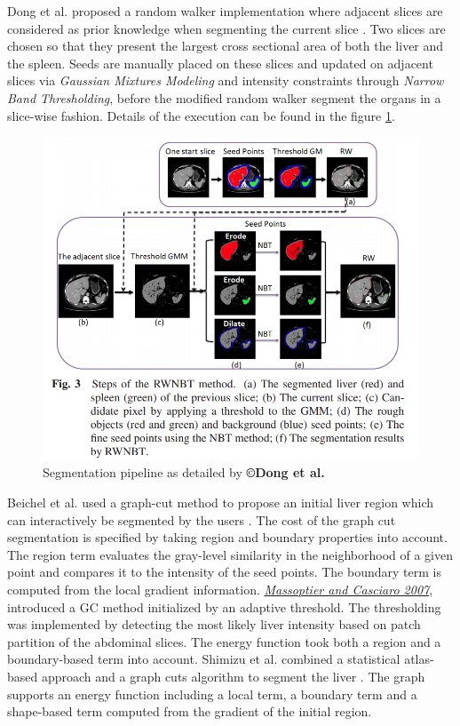 \documentclass[]{article}
\begin{document}
	Dong et al. proposed a random walker implementation where adjacent slices are
	considered as prior knowledge when segmenting the current slice \cite{Dong2016}. Two
	slices are chosen so that they present the largest cross sectional area
	of both the liver and the spleen. Seeds are manually placed on these
	slices and updated on adjacent slices via \emph{Gaussian Mixtures
		Modeling} and intensity constraints through \emph{Narrow Band
		Thresholding}, before the modified random walker segment the organs in a
	slice-wise fashion. Details of the execution can be found in the figure
	\ref{Dong2016_Fig3}.
	
	\begin{figure}[th!]
		\centering
		\includegraphics[width=0.7\linewidth]{images/image14}
		\caption{Segmentation pipeline as detailed by \textbf{©Dong et al.} \cite{Dong2016}}
		\label{Dong2016_Fig3}
	\end{figure}
	
	
	Beichel et al. used a graph-cut method to propose an initial liver
	region which can interactively be segmented by the users \cite{Beichel2004}. The cost of
	the graph cut segmentation is specified by taking region and boundary
	properties into account. The region term evaluates the gray-level
	similarity in the neighborhood of a given point and compares it to the
	intensity of the seed points. The boundary term is computed from the
	local gradient information.
	\href{https://www.researchgate.net/publication/5844188_Fully_Automatic_Liver_Segmentation_through_Graph-Cut_Technique}{\emph{Massoptier
			and Casciaro 2007}}, introduced a GC method initialized by an adaptive
	threshold. The thresholding was implemented by detecting the most likely
	liver intensity based on patch partition of the abdominal slices. The
	energy function took both a region and a boundary-based term into
	account.
	Shimizu et al. combined a statistical atlas-based approach and a graph
	cuts algorithm to segment the liver \cite{Shimizu2011}. The graph supports an energy
	function including a local term, a boundary term and a shape-based term
	computed from the gradient of the initial region.
	
\end{document}
